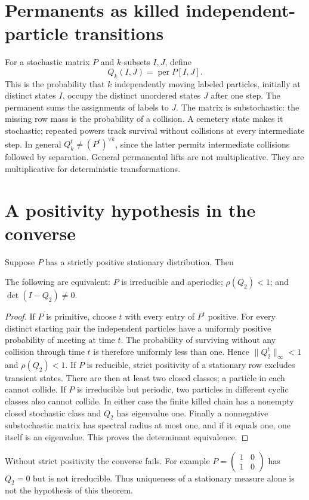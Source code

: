\section{Permanents as killed independent-particle transitions}
\label{organized:permanent-core}

For a stochastic matrix $P$ and $k$-subsets $I,J$, define
\[
 Q_k(I,J)=\operatorname{per}P[I,J].
\]
This is the probability that $k$ independently moving labeled particles,
initially at distinct states $I$, occupy the distinct unordered states $J$
after one step. The permanent sums the assignments of labels to $J$.
The matrix is substochastic: the missing row mass is the probability of
a collision. A cemetery state makes it stochastic; repeated powers track
survival without collisions at every intermediate step.
In general $Q_k^t\ne(P^t)^{\vee k}$, since the latter permits intermediate
collisions followed by separation. General permanental lifts are not
multiplicative. They are multiplicative for deterministic transformations.

\section{A positivity hypothesis in the converse}
Suppose $P$ has a strictly positive stationary distribution. Then
\begin{theorem}\label{organized:permanent-criterion}
The following are equivalent: $P$ is irreducible and aperiodic;
$\rho(Q_2)<1$; and $\det(I-Q_2)\ne0$.
\end{theorem}
\begin{proof}
If $P$ is primitive, choose $t$ with every entry of $P^t$ positive.
For every distinct starting pair the independent particles have a
uniformly positive probability of meeting at time $t$. The probability
of surviving without any collision through time $t$ is therefore
uniformly less than one. Hence $\|Q_2^t\|_\infty<1$ and $\rho(Q_2)<1$.
If $P$ is reducible, strict positivity of a stationary row excludes
transient states. There are then at least two closed classes; a particle
in each cannot collide. If $P$ is irreducible but periodic, two particles
in different cyclic classes also cannot collide. In either case the
finite killed chain has a nonempty closed stochastic class and $Q_2$
has eigenvalue one. Finally a nonnegative substochastic matrix has
spectral radius at most one, and if it equals one, one itself is an
eigenvalue. This proves the determinant equivalence.
\end{proof}
Without strict positivity the converse fails. For example
$P=\left(\begin{smallmatrix}1&0\\1&0\end{smallmatrix}\right)$ has
$Q_2=0$ but is not irreducible. Thus uniqueness of a stationary measure
alone is not the hypothesis of this theorem.

